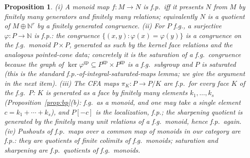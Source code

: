 \documentclass[11pt]{article}
\newtheorem{proposition}[theorem]{Proposition}
\theoremstyle{definition}
\newcommand{\gp}{\mathrm{gp}}
\begin{document}
\begin{proposition}\label{prop:fp}
\textup{(}i\textup{)} A monoid map $f:M\to N$ is f.p.\ iff it
presents $N$ from $M$ by finitely many generators and finitely
many relations; equivalently $N$ is a quotient of
$M\oplus\mathbb N^r$ by a finitely generated congruence.
\textup{(}ii\textup{)} For $P$ f.g., a surjective $\varphi:P\to
\mathbb N$ is f.p.: the congruence
$\{(x,y):\varphi(x)=\varphi(y)\}$ is a congruence on the f.g.\
monoid $P\times P$, generated as such by the kernel face
relations and the analogous pointed-cone data; concretely it is
the saturation of a f.g.\ congruence because the graph of
$\ker\varphi^{\gp}\subseteq P^{\gp}\times P^{\gp}$ is a f.g.\
 subgroup and $P$ is saturated \textup{(}this is the standard
f.p.-of-integral-saturated-maps lemma; we give the argument in
the next item\textup{)}.
\textup{(}iii\textup{)} The CFA maps $\pi_K:P\to P/K$ are f.p.\
for every face $K$ of the f.g.\ $P$: $K$ is generated as a face
by finitely many elements $k_1,\dots,k_s$
\textup{(}Proposition~\ref{prop:bp}\textup{(}b\textup{):} f.g.\
as a monoid, and one may take a single element
$c=k_1+\cdots+k_s$\textup{)}, and $P[-c]$ is the localization,
f.p.; the sharpening quotient is generated by the finitely many
unit relations of a f.g.\ monoid, hence f.p.\ again.
\textup{(}iv\textup{)} Pushouts of f.p.\ maps over a common map
of monoids in our category are f.p.: they are quotients of
finite colimits of f.g.\ monoids; saturation and sharpening are
f.p.\ quotients of f.g.\ monoids.
\end{proposition}
\end{document}
